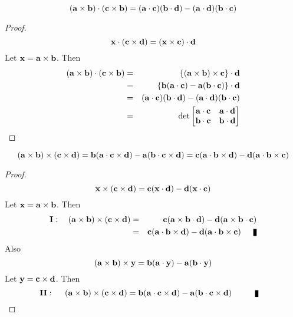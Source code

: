 \begin{theorem}
\[ ({\bf a} \times {\bf b}) \cdot ({\bf c} \times {\bf b}) = ({\bf a}\cdot {\bf c})({\bf b}\cdot {\bf d}) - ({\bf a}\cdot {\bf d})({\bf b}\cdot {\bf c}) \]
\end{theorem}
\begin{proof}
\[ {\bf x}\cdot ({\bf c}\times{\bf d}) = ({\bf x}\times {\bf c})\cdot{\bf d}\] Let ${\bf x} = {\bf a}\times{\bf b}$. Then 
\begin{eqnarray*}
({\bf a} \times {\bf b}) \cdot ({\bf c} \times {\bf b}) &=&\{({\bf a} \times {\bf b})  \times {\bf c}\} \cdot {\bf d} \\
&=& \{{\bf b}({\bf a}\cdot {\bf c}) - {\bf a}({\bf b}\cdot {\bf c}) \}\cdot {\bf d} \\
&=& ({\bf a}\cdot {\bf c})({\bf b}\cdot {\bf d}) - ({\bf a}\cdot {\bf d})({\bf b}\cdot {\bf c}) \\
&=&\det\begin{bmatrix}
{\bf a}\cdot {\bf c} & {\bf a}\cdot {\bf d} \\
{\bf b}\cdot {\bf c} & {\bf b}\cdot {\bf d}
\end{bmatrix}
\end{eqnarray*} 
\end{proof}

\begin{theorem}
\[ ({\bf a} \times {\bf b}) \times ({\bf c} \times {\bf d}) = {\bf b}({\bf a}\cdot {\bf c}\times {\bf d}) - {\bf a}({\bf b}\cdot {\bf c}\times {\bf d}) =  {\bf c}({\bf a}\cdot {\bf b}\times {\bf d}) - {\bf d}({\bf a}\cdot {\bf b}\times {\bf c})\]
\end{theorem}
\begin{proof}
\[ {\bf x} \times ({\bf c} \times {\bf d}) = {\bf c}({\bf x}\cdot {\bf d}) - {\bf d}({\bf x}\cdot {\bf c}) \] Let ${\bf x} = {\bf a}\times {\bf b}$. Then 
\begin{eqnarray*}
{\bf I}: ~~~({\bf a} \times {\bf b}) \times ({\bf c} \times {\bf d}) &=& {\bf c}({\bf a}\times {\bf b}\cdot {\bf d}) - {\bf d}({\bf a}\times {\bf b}\cdot {\bf c}) \\ 
 &=& {\bf c}({\bf a}\cdot {\bf b}\times {\bf d}) - {\bf d}({\bf a}\cdot {\bf b}\times{\bf c})\qed
\end{eqnarray*}
Also 
\[ ({\bf a} \times {\bf b}) \times {\bf y}  = {\bf b}({\bf a}\cdot {\bf y}) - {\bf a}({\bf b}\cdot {\bf y}) \] Let ${\bf y} = {\bf c}\times {\bf d}$. Then 
\[ {\bf II}:~~~~ ({\bf a} \times {\bf b}) \times ({\bf c} \times {\bf d}) ={\bf b}({\bf a}\cdot {\bf c}\times{\bf d}) - {\bf a}({\bf b}\cdot {\bf c}\times{\bf d})~~~~\qed~~~\]
\end{proof}


